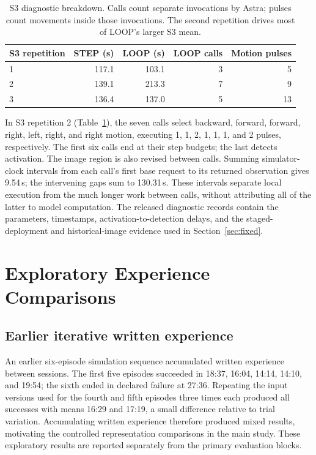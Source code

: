 \documentclass[11pt]{article}
\begin{document}
\begin{table}[H]\centering\small
\begin{tabular}{lrrrr}\toprule
S3 repetition & STEP (s) & LOOP (s) & LOOP calls & Motion pulses\\\midrule
1 & 117.1 & 103.1 & 3 & 5\\
2 & 139.1 & 213.3 & 7 & 9\\
3 & 136.4 & 137.0 & 5 & 13\\\bottomrule
\end{tabular}
\caption{S3 diagnostic breakdown. Calls count separate invocations by Astra; pulses count movements inside those invocations. The second repetition drives most of LOOP's larger S3 mean.}\label{tab:s3-diagnostics}
\end{table}

In S3 repetition 2 (Table~\ref{tab:s3-diagnostics}), the seven calls select backward, forward, forward, right, left, right, and right motion, executing 1, 1, 2, 1, 1, 1, and 2 pulses, respectively. The first six calls end at their step budgets; the last detects activation. The image region is also revised between calls. Summing simulator-clock intervals from each call's first base request to its returned observation gives 9.54\,s; the intervening gaps sum to 130.31\,s. These intervals separate local execution from the much longer work between calls, without attributing all of the latter to model computation. The released diagnostic records contain the parameters, timestamps, activation-to-detection delays, and the staged-deployment and historical-image evidence used in Section~\ref{sec:fixed}.

\section{Exploratory Experience Comparisons}\label{app:exploratory}
\subsection{Earlier iterative written experience}
An earlier six-episode simulation sequence accumulated written experience between sessions. The first five episodes succeeded in 18:37, 16:04, 14:14, 14:10, and 19:54; the sixth ended in declared failure at 27:36. Repeating the input versions used for the fourth and fifth episodes three times each produced all successes with means 16:29 and 17:19, a small difference relative to trial variation. Accumulating written experience therefore produced mixed results, motivating the controlled representation comparisons in the main study. These exploratory results are reported separately from the primary evaluation blocks.
\end{document}
